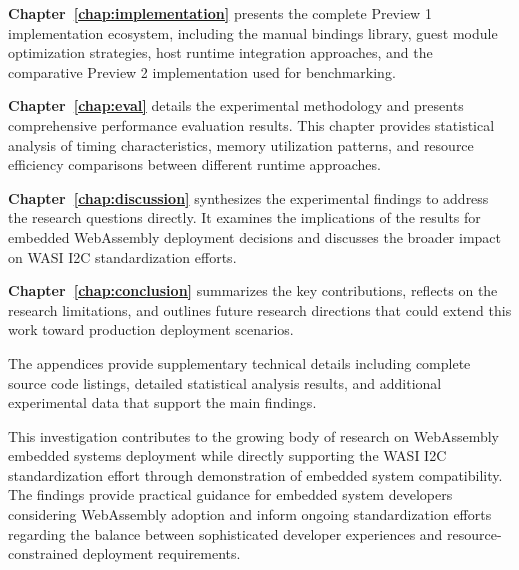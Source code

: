 \textbf{Chapter~\ref{chap:implementation}} presents the complete Preview 1 implementation ecosystem, including the manual bindings library, guest module optimization strategies, host runtime integration approaches, and the comparative Preview 2 implementation used for benchmarking.

\textbf{Chapter~\ref{chap:eval}} details the experimental methodology and presents comprehensive performance evaluation results. This chapter provides statistical analysis of timing characteristics, memory utilization patterns, and resource efficiency comparisons between different runtime approaches.

\textbf{Chapter~\ref{chap:discussion}} synthesizes the experimental findings to address the research questions directly. It examines the implications of the results for embedded WebAssembly deployment decisions and discusses the broader impact on WASI I2C standardization efforts.

\textbf{Chapter~\ref{chap:conclusion}} summarizes the key contributions, reflects on the research limitations, and outlines future research directions that could extend this work toward production deployment scenarios.

The appendices provide supplementary technical details including complete source code listings, detailed statistical analysis results, and additional experimental data that support the main findings.


This investigation contributes to the growing body of research on WebAssembly embedded systems deployment while directly supporting the WASI I2C standardization effort through demonstration of embedded system compatibility. The findings provide practical guidance for embedded system developers considering WebAssembly adoption and inform ongoing standardization efforts regarding the balance between sophisticated developer experiences and resource-constrained deployment requirements.